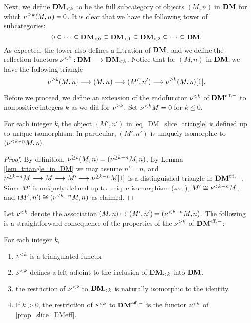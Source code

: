 Next, we define $\LFiltDM[k]{\DM}$ to be the full subcategory of 
objects $(M, n)$ in $\DM$ for which $\sgDM{k}(M, n) = 0$. It is
clear that we have the following tower of subcategories:
\begin{equation}\label{eq_DM_slice_cofilt}
0 \subseteq \cdots \subseteq \LFiltDM[0]{\DM} \subseteq 
   \LFiltDM[1]{\DM} \subseteq \LFiltDM[2]{\DM} \subseteq \cdots 
   \subseteq \DM.
\end{equation}
As expected, the tower also defines a filtration of $\DM$, and
we define the reflection functors $\slDM{k} : \DM \to 
\LFiltDM[k]{\DM}$. Notice that for $(M, n)$ in $\DM$, we have the 
following triangle
\begin{equation}\label{eq_DM_slice_triangle}
\sgDM{k} (M, n) \to (M, n) \to (M', n') \to \sgDM{k} (M, n)[1].
\end{equation}

Before we proceed, we define an extension of the endofunctor 
$\slDM{k}$ of $\DMeff$ to nonpositive integers $k$ as we did for 
$\sgDM{k}$. Set $\slDM{k} M = 0$ for $k \leq 0$.

\begin{lem}
For each integer $k$, the object $(M', n')$ in 
\eqref{eq_DM_slice_triangle} is defined up to unique isomorphism.
In particular, $(M', n')$ is uniquely isomorphic to 
$(\slDM{k - n} M, n)$.
\end{lem}
\begin{proof}
  By definition, $\sgDM{k}(M, n) = (\sgDM{k - n}M, n)$. By Lemma
  \ref{lem_triangle_in_DM} we may assume $n' = n$, and $\sgDM{k -
    n} M \to M \to M' \to \sgDM{k - n}M[1]$ is a distinguished
  triangle in $\DMeff$. Since $M'$ is uniquely defined up to unique
  isomorphism (see \cite[1.3(i)]{HuKa}), $M' \cong \slDM{k - n} M$,
  and $(M', n') \cong (\slDM{k - n}M, n)$ as claimed.
\end{proof}

Let $\slDM{k}$ denote the association $(M, n) \mapsto (M', n') =
(\slDM{k - n}M, n)$. The following is a straightforward consequence
of the properties of the $\sgDM{k}$ of $\DMeff$:

\begin{prop}\label{prop_slDM_functor}
For each integer $k$,
\begin{enumerate}
\item $\slDM{k}$ is a triangulated functor

\item $\slDM{k}$ defines a left adjoint to the inclusion of 
$\LFiltDM[k]{\DM}$ into $\DM$.

\item the restriction of $\slDM{k}$ to $\LFiltDM[k]{\DM}$ is naturally
isomorphic to the identity.

\item If $k \gt 0$, the restriction of $\slDM{k}$ to $\DMeff$ is the
  functor $\slDM{k}$ of \ref{prop_slice_DMeff}.
\end{enumerate}
\end{prop}

